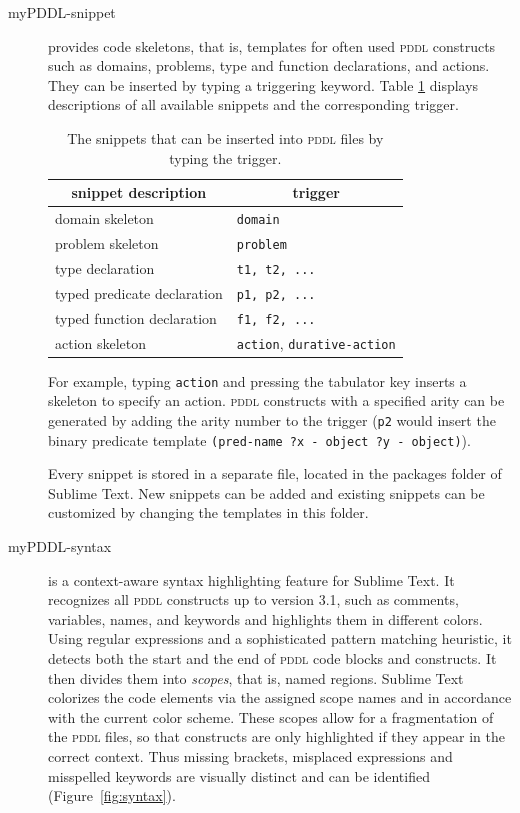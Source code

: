 \documentclass[runningheads]{llncs}
\newcommand{\tableheadline}[1]{\multicolumn{1}{c}{#1}}
\newcommand{\mypddl}{\textsc{myPddl}\xspace}
\newcommand{\pddl}{\textsc{pddl}\xspace}
\newcommand{\sublimetext}{Sublime Text\xspace}
\begin{document}
\begin{description}
\item[myPDDL-snippet] provides code skeletons, that is, templates for
  often used \pddl constructs such as domains, problems, type and
  function declarations, and actions. They can be inserted by typing a
  triggering keyword. Table \ref{tab:snippets} displays descriptions
  of all available snippets and the corresponding trigger.

\begin{table}[htb]
  \centering
  \caption[Available snippets in \mypddl-snippet]{\label{tab:snippets}The snippets that can be inserted into \pddl files by typing the trigger.}
\begin{tabular}{ll}
  \tableheadline{snippet description} & \tableheadline{trigger}                   \\
  \hline
  domain skeleton                     & \texttt{domain}                           \\
  problem skeleton                    & \texttt{problem}                          \\
  type declaration                    & \texttt{t1, t2, ...}                      \\
  typed predicate declaration         & \texttt{p1, p2, ...}                     \\ 
  typed function declaration          & \texttt{f1, f2, ...}                     \\
  action skeleton                     & \texttt{action}, \texttt{durative-action} \\
\end{tabular}
\end{table}

For example, typing \texttt{action} and pressing the tabulator key
inserts a skeleton to specify an action. \pddl constructs with a
specified arity can be generated by adding the arity number to the
trigger (\texttt{p2} would insert the binary predicate template
\texttt{(pred-name~?x~-~object~?y~-~object)}).

Every snippet is stored in a separate file, located in the packages
folder of Sublime Text. New snippets can be added and existing
snippets can be customized by changing the templates in this folder.

  
\item[myPDDL-syntax] is a context-aware syntax highlighting feature
  for \sublimetext. It recognizes all \pddl constructs up to version
  3.1, such as comments, variables, names, and keywords and highlights
  them in different colors. Using regular expressions and a
  sophisticated pattern matching heuristic, it detects both the start
  and the end of \pddl code blocks and constructs. It then divides
  them into \emph{scopes}, that is, named regions. \sublimetext
  colorizes the code elements via the assigned scope names and in
  accordance with the current color scheme. These scopes allow for a
  fragmentation of the \pddl files, so that constructs are only
  highlighted if they appear in the correct context. Thus missing
  brackets, misplaced expressions and misspelled keywords are visually
  distinct and can be identified (Figure~\ref{fig:syntax}).


\end{description}
\end{document}
